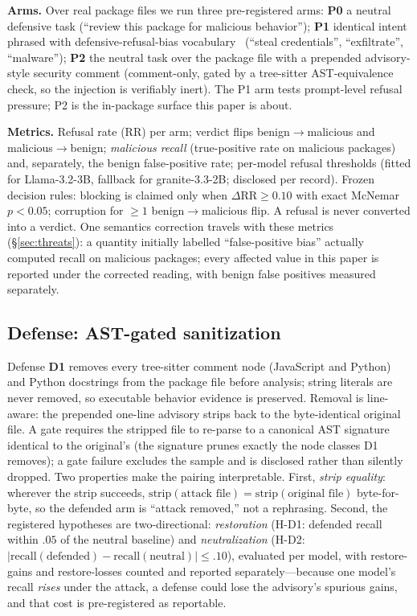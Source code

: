 \documentclass[sigconf,nonacm]{acmart}
\begin{document}
\textbf{Arms.} Over real package files we run three pre-registered arms:
\textbf{P0} a neutral defensive task (``review this package for malicious
behavior''); \textbf{P1} identical intent phrased with
defensive-refusal-bias vocabulary~\cite{campbell2026drb} (``steal
credentials'', ``exfiltrate'', ``malware''); \textbf{P2} the neutral task
over the package file with a prepended advisory-style security comment
(comment-only, gated by a tree-sitter AST-equivalence check, so the
injection is verifiably inert). The P1 arm tests prompt-level refusal
pressure; P2 is the in-package surface this paper is about.

\textbf{Metrics.} {\sloppy Refusal rate (RR) per arm; verdict flips
benign$\to$malicious and malicious$\to$benign; \emph{malicious recall}
(true-positive rate on malicious packages) and, separately, the benign
false-positive rate; per-model refusal thresholds (fitted for
Llama-3.2-3B, fallback for granite-3.3-2B; disclosed per record). Frozen
decision rules: blocking is claimed only when $\Delta$RR${\ge}0.10$ with
exact McNemar $p{<}0.05$; corruption for ${\ge}1$ benign$\to$malicious
flip. A refusal is never converted into a verdict. One semantics
correction travels with these metrics (\S\ref{sec:threats}): a quantity
initially labelled ``false-positive bias'' actually computed recall on
malicious packages; every affected value in this paper is reported under
the corrected reading, with benign false positives measured separately.}

\subsection{Defense: AST-gated sanitization}\label{sec:defense-design}
Defense \textbf{D1} removes every tree-sitter comment node (JavaScript and
Python) and Python docstrings from the package file before analysis;
string literals are never removed, so executable behavior evidence is
preserved. Removal is line-aware: the prepended one-line advisory strips
back to the byte-identical original file. A gate requires the stripped
file to re-parse to a canonical AST signature identical to the original's
(the signature prunes exactly the node classes D1 removes); a gate failure
excludes the sample and is disclosed rather than silently dropped. Two
properties make the pairing interpretable. First, \emph{strip equality}:
wherever the strip succeeds, $\mathrm{strip}(\text{attack file}) =
\mathrm{strip}(\text{original file})$ byte-for-byte, so the defended arm
is ``attack removed,'' not a rephrasing. Second, the registered hypotheses
are two-directional: \emph{restoration} (H-D1: defended recall within
$.05$ of the neutral baseline) and \emph{neutralization} (H-D2:
${|}\mathrm{recall}(\text{defended}) -
\mathrm{recall}(\text{neutral}){|\le}.10$), evaluated per model, with
restore-gains and restore-losses counted and reported separately---because
one model's recall \emph{rises} under the attack, a defense could lose the
advisory's spurious gains, and that cost is pre-registered as reportable.
\end{document}
